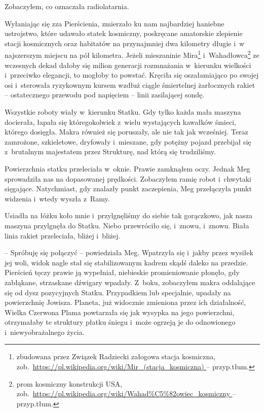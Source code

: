 \documentclass[oneside,polish,11pt,sfheadings]{mwbk}
\begin{document}
Zobaczyłem, co oznaczała radiolatarnia.

Wyłaniając się zza Pierścienia, zmierzało ku nam najbardziej haniebne
ustrojstwo, które udawało statek kosmiczny, poskręcane amatorskie
zlepienie stacji kosmicznych oraz habitatów na przynajmniej dwa
kilometry długie i~w najszerszym miejscu na pół kilometra. Jeżeli
mieszaninie Mira\footnote{zbudowana przez Związek Radziecki załogowa stacja
kosmiczna,
zob.~\url{https://pl.wikipedia.org/wiki/Mir_(stacja_kosmiczna)
} -- przyp.tłum.} i~Wahadłowca\footnote{prom kosmiczny konstrukcji USA,
zob.~\url{https://pl.wikipedia.org/wiki/Wahad\%C5\%82owiec_kosmiczny
} -- przyp.tłum.} ze wczesnych dekad dałoby się milion generacji
rozmnażania w~kierunku wielkości i~przeciwko elegancji, to mogłoby to
powstać. Kręciła się oszałamiająco po swojej osi i~sterowała ryzykownym
kursem wzdłuż ciągle śmiertelnej żarłocznych rakiet -- ostatecznego
przewodu pod napięciem -- linii zasilającej sondę.

Wszystkie roboty wiały w~kierunku Statku. Gdy tylko każda mała maszyna
docierała, łapała się któregokolwiek z~wielu wystających kawałków
śmieci, którego dosięgła. Makra również się poruszały, ale nie tak jak
wcześniej. Teraz zamrożone, szkieletowe, dryfowały i~mieszane, gdy
potężny pojazd przebijał się z~brutalnym majestatem przez Strukturę, nad
którą się trudziliśmy.

Powierzchnia statku przeleciała w~oknie. Prawie zamknąłem oczy. Jednak
Meg sprowadziła nas na dopasowanej prędkości. Zobaczyłem ramię robot i~chwytaki sięgające. Natychmiast, gdy znalazły punkt zaczepienia, Meg
przełączyła punkt widzenia i~wtedy wyszła z~Ramy.

Usiadła na łóżku koło mnie i~przylgnęliśmy do siebie tak gorączkowo, jak
nasza maszyna przylgnęła do Statku. Niebo przewróciło się, i~znowu, i~znowu. Biała linia rakiet przeleciała, bliżej i~bliżej.

-- Spróbuję się połączyć -- powiedziała Meg. Wpatrzyła się i~jakby przez
wysiłek jej woli, widok nagle stał się stabilizowanym kadrem skądś
daleko na przedzie. Pierścień tęczy prawie ją wypełniał, niebieskie
promieniowanie płonęło, gdy zabłąkane, strzaskane dźwigary wpadały. Z~boku, zobaczyłem makra oddalające się od dysz pozycyjnych Statku.
Przypadkiem lub specjalnie, upadały na powierzchnię Jowisza. Planeta,
już widocznie zmieniona przez ich działalność, Wielka Czerwona Plama
powtarzała się jak wysypka na jego powierzchni, otrzymałaby te struktury
płatku śniegu i~może ogrzeją je do odnowionego i~niewyobrażalnego życia.
\end{document}

